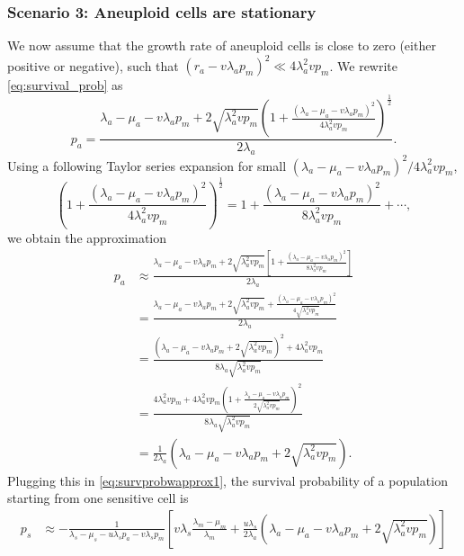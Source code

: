 \documentclass[12pt]{extarticle}
\renewcommand{\Delta}{r}
\begin{document}
\begin{appendices}
\subsubsection*{Scenario 3: Aneuploid cells are stationary} 
We now assume that the growth rate of aneuploid cells is close to zero (either positive or negative), such that  $\left(\Delta_a-v\lambda_ap_m\right)^2 \ll 4\lambda_a^2vp_m$.
We rewrite \cref{eq:survival_prob} as
\begin{equation}
p_a = \frac{\lambda_a-\mu_a-v\lambda_ap_m+2\sqrt{\lambda_a^2 vp_m}\left(1+\frac{\left(\lambda_a-\mu_a-v\lambda_ap_m\right)^2}{4\lambda_a^2vp_m}\right)^{\frac12}}{2\lambda_a} .
\end{equation}
Using a following Taylor series expansion for small $\left(\lambda_a-\mu_a-v\lambda_ap_m\right)^2 / 4\lambda_a^2vp_m$,
\begin{equation*}
\left(1+\frac{\left(\lambda_a-\mu_a-v\lambda_ap_m\right)^2}{4\lambda_a^2vp_m}\right)^{\frac{1}{2}}=1+\frac{\left(\lambda_a-\mu_a-v\lambda_ap_m\right)^2}{8\lambda_a^2vp_m}+\cdots,
\end{equation*}
we obtain the approximation
\begin{equation}
\begin{aligned}
p_a&\approx\frac{\lambda_a-\mu_a-v\lambda_ap_m+2\sqrt{\lambda_a^2 vp_m}\left[1+\frac{\left(\lambda_a-\mu_a-v\lambda_ap_m\right)^2}{8\lambda_a^2vp_m}\right]}{2\lambda_a}\\
&=\frac{\lambda_a-\mu_a-v\lambda_ap_m+2\sqrt{\lambda_a^2 vp_m}+\frac{\left(\lambda_a-\mu_a-v\lambda_ap_m\right)^2}{4\sqrt{\lambda_a^2vp_m}}}{2\lambda_a}\\
&=\frac{\left(\lambda_a-\mu_a-v\lambda_ap_m+2\sqrt{\lambda_a^2vp_m}\right)^2+4\lambda_a^2vp_m}{8\lambda_a\sqrt{\lambda_a^2vp_m}}\\
&=\frac{4\lambda_a^2vp_m+4\lambda_a^2vp_m\left(1+\frac{\lambda_a-\mu_a-v\lambda_ap_m}{2\sqrt{\lambda_a^2vp_m}}\right)^2}{8\lambda_a\sqrt{\lambda_a^2vp_m}}\\
&=\frac{1}{2\lambda_a}\left(\lambda_a-\mu_a-v\lambda_ap_m+2\sqrt{\lambda_a^2vp_m}\right).
\end{aligned}
\end{equation}
Plugging this in \cref{eq:survprobwapprox1}, the survival probability of a population starting from one sensitive cell is
\begin{equation}\label{eq:scenario3}
\begin{aligned}
p_s&\approx-\frac{1}{\lambda_s-\mu_s-u\lambda_sp_a-v\lambda_sp_m}\left[v\lambda_s\frac{\lambda_m-\mu_m}{\lambda_m}+\frac{u\lambda_s}{2\lambda_a}\left(\lambda_a-\mu_a-v\lambda_ap_m+2\sqrt{\lambda_a^2vp_m}\right)\right]\\

\end{aligned}
\end{equation}
\end{appendices}
\end{document}
